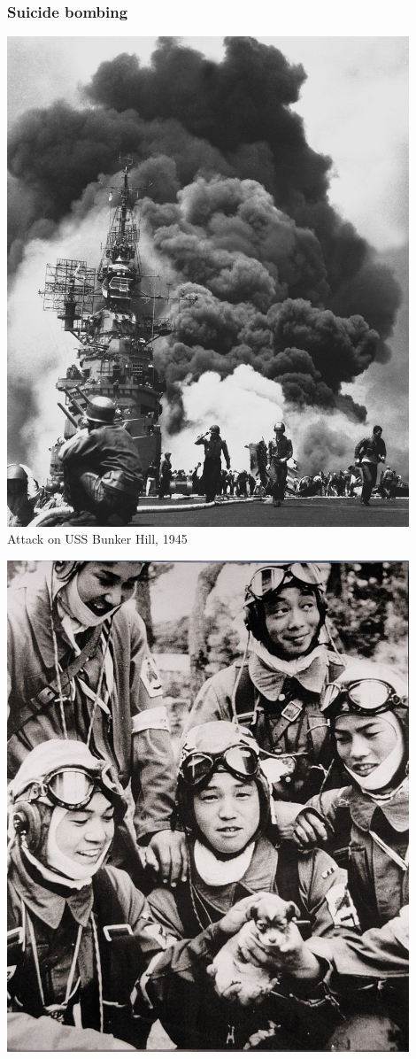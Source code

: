 \documentclass[aspectratio=43]{beamer}
\begin{document}
\begin{frame}
\frametitle{Suicide bombing}
\centering

\begin{minipage}{0.49\textwidth}\centering
\includegraphics[width = 0.9\textwidth]{img/USS_Bunker_Hill_crop}\\{\footnotesize Attack on USS Bunker Hill, 1945}
\end{minipage}\hfill
\begin{minipage}{0.49\textwidth}\centering
\includegraphics[width = 0.9\textwidth]{img/Kamikazes}
\end{minipage}


\end{frame}
\end{document}
